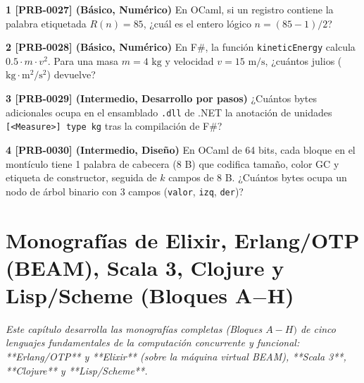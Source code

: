 \documentclass{book}
\begin{document}
\begin{tcolorbox}[title={Ejercicios}, studiumworked, breakable]

\noindent\textbf{1 [PRB-0027] (Básico, Numérico)}
En OCaml, si un registro contiene la palabra etiquetada \(R(n) = 85\), ¿cuál es el entero lógico \(n = (85 - 1) / 2\)?

\noindent\textbf{2 [PRB-0028] (Básico, Numérico)}
En F\#, la función \texttt{kineticEnergy} calcula \(0.5 \cdot m \cdot v^2\). Para una masa \(m = 4\text{ kg}\) y velocidad \(v = 15\text{ m/s}\), ¿cuántos julios (\(\text{kg}\cdot\text{m}^2/\text{s}^2\)) devuelve?

\noindent\textbf{3 [PRB-0029] (Intermedio, Desarrollo por pasos)}
¿Cuántos bytes adicionales ocupa en el ensamblado \texttt{.dll} de .NET la anotación de unidades \texttt{[<Measure>] type kg} tras la compilación de F\#?

\noindent\textbf{4 [PRB-0030] (Intermedio, Diseño)}
En OCaml de 64 bits, cada bloque en el montículo tiene 1 palabra de cabecera (8 B) que codifica tamaño, color GC y etiqueta de constructor, seguida de \(k\) campos de 8 B. ¿Cuántos bytes ocupa un nodo de árbol binario con 3 campos (\texttt{valor}, \texttt{izq}, \texttt{der})?
\end{tcolorbox}

\chapter{Monografías de Elixir, Erlang/OTP (BEAM), Scala 3, Clojure y Lisp/Scheme (Bloques A\(-\)H)}
\label{chap:cap06-monografias-beam-elixir-erlang-scala3-clojure-lisp}

\noindent\textit{Este capítulo desarrolla las monografías completas (Bloques \(A-H)\) de cinco lenguajes fundamentales de la computación concurrente y funcional: **Erlang/OTP** y **Elixir** (sobre la máquina virtual BEAM), **Scala 3**, **Clojure** y **Lisp/Scheme**.}
\end{document}
